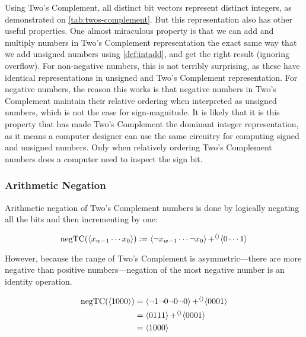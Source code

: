 Using Two's Complement, all distinct bit vectors represent distinct
integers, as demonstrated on \cref{tab:twos-complement}.  But this
representation also has other useful properties.  One almost
miraculous property is that we can add and multiply numbers in Two's
Complement representation the exact same way that we add unsigned
numbers using \cref{def:intadd}, and get the right result (ignoring
overflow).  For non-negative numbers, this is not terribly surprising,
as these have identical representations in unsigned and Two's
Complement representation.  For negative numbers, the reason this
works is that negative numbers in Two's Complement maintain their
relative ordering when interpreted as unsigned numbers, which is not
the case for sign-magnitude.  It is likely that it is this property
that has made Two's Complement the dominant integer representation, as
it means a computer designer can use the same circuitry for computing
signed and unsigned numbers.  Only when relatively ordering Two's
Complement numbers does a computer need to inspect the sign bit.

\subsubsection{Arithmetic Negation}

Arithmetic negation of Two's Complement numbers is done by logically
negating all the bits and then incrementing by one:

\begin{definition}
  \[
    \mathrm{negTC}(\langle x_{w-1}\cdots{}x_{0} \rangle) \vcentcolon= \langle \neg{}x_{w-1}\cdots{}\neg{}x_{0} \rangle \operatorname{+^{\langle\rangle}} \langle 0\cdots{}1 \rangle
  \]
\end{definition}

However, because the range of Two's Complement is asymmetric---there
are more negative than positive numbers---negation of the most
negative number is an identity operation.

\begin{example}
  \begin{align}
    \mathrm{negTC}(\langle 1000 \rangle)
    &= \langle \neg 1 \neg 0 \neg 0 \neg 0 \rangle \operatorname{+^{\langle\rangle}} \langle 0001 \rangle \\
    &= \langle 0 1 1 1 \rangle \operatorname{+^{\langle\rangle}} \langle 0001 \rangle \\
    &= \langle 1 0 0 0 \rangle
  \end{align}
\end{example}

